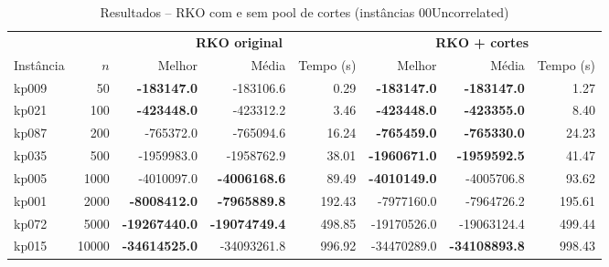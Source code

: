 \begin{table}[htbp]
\centering
\caption{Resultados -- RKO com e sem pool de cortes (instâncias 00Uncorrelated)}
\label{tab:cuts}
\begin{tabular}{lrrrrrrr}
\toprule
 & & \multicolumn{3}{c}{\textbf{RKO original}} & \multicolumn{3}{c}{\textbf{RKO + cortes}} \\
\cmidrule(lr){3-5} \cmidrule(lr){6-8}
Instância & $n$ & Melhor & Média & Tempo (s) & Melhor & Média & Tempo (s) \\
\midrule
kp009 & 50 & \textbf{-183147.0} & -183106.6 & 0.29 & \textbf{-183147.0} & \textbf{-183147.0} & 1.27 \\
kp021 & 100 & \textbf{-423448.0} & -423312.2 & 3.46 & \textbf{-423448.0} & \textbf{-423355.0} & 8.40 \\
kp087 & 200 & -765372.0 & -765094.6 & 16.24 & \textbf{-765459.0} & \textbf{-765330.0} & 24.23 \\
kp035 & 500 & -1959983.0 & -1958762.9 & 38.01 & \textbf{-1960671.0} & \textbf{-1959592.5} & 41.47 \\
kp005 & 1000 & -4010097.0 & \textbf{-4006168.6} & 89.49 & \textbf{-4010149.0} & -4005706.8 & 93.62 \\
kp001 & 2000 & \textbf{-8008412.0} & \textbf{-7965889.8} & 192.43 & -7977160.0 & -7964726.2 & 195.61 \\
kp072 & 5000 & \textbf{-19267440.0} & \textbf{-19074749.4} & 498.85 & -19170526.0 & -19063124.4 & 499.44 \\
kp015 & 10000 & \textbf{-34614525.0} & -34093261.8 & 996.92 & -34470289.0 & \textbf{-34108893.8} & 998.43 \\
\bottomrule
\end{tabular}
\end{table}
